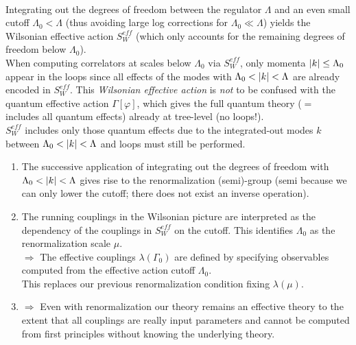 \\
Integrating out the degrees of freedom between the regulator $\Lambda$ and an even small cutoff $\Lambda_0 < \Lambda$ (thus avoiding large log corrections for $\Lambda_0 \ll \Lambda$) yields the Wilsonian effective action $S^{eff}_W$ (which only accounts for the remaining degrees of freedom below $\Lambda_0$).\\
When computing correlators at scales below $\Lambda_0$ via $S^{eff}_W$, only momenta $\abs{k} \leq \Lambda_0$ appear in the loops since all effects of the modes with $\Lambda_0 < \abs{k} < \Lambda$ are already encoded in $S^{eff}_W$. This \emph{Wilsonian effective action} is \emph{not} to be confused with the quantum effective action $\Gamma[\varphi]$, which gives the full quantum theory ($=$ includes all quantum effects) already at tree-level (no loops!).\\
$S^{eff}_W$ includes only those quantum effects due to the integrated-out modes $k$ between $\Lambda_0 < \abs{k} < \Lambda$ and loops must still be performed.
\begin{enumerate}
	\item The successive application of integrating out the degrees of freedom with $\Lambda_0 < \abs{k} < \Lambda$ gives rise to the renormalization (semi)-group (semi because we can only lower the cutoff; there does not exist an inverse operation).
	\item The running couplings in the Wilsonian picture are interpreted as the dependency of the couplings in $S^{eff}_W$ on the cutoff. This identifies $\Lambda_0$ as the renormalization scale $\mu$. \\
	$\Rightarrow$ The effective couplings $\lambda(\Gamma_0)$ are defined by specifying observables computed from the effective action cutoff $\Lambda_0$.\\
	This replaces our previous renormalization condition fixing $\lambda(\mu)$.
	\item $\Rightarrow$ Even with renormalization our theory remains an effective theory to the extent that all couplings are really input parameters and cannot be computed from first principles without knowing the underlying theory.
\end{enumerate}
